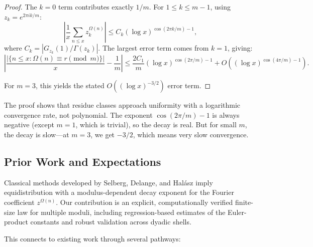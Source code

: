 \documentclass[12pt]{article}
\theoremstyle{definition}
\theoremstyle{remark}
\begin{document}
\begin{proof}
The $k = 0$ term contributes exactly $1/m$. For $1 \leq k \leq m-1$, using $z_k = e^{2\pi ik/m}$:
\[
\left|\frac{1}{x}\sum_{n \leq x} z_k^{\Omega(n)}\right| \leq C_k (\log x)^{\cos(2\pi k/m) - 1},
\]
where $C_k = |G_{z_k}(1)/\Gamma(z_k)|$. The largest error term comes from $k = 1$, giving:
\[
\left|\frac{|\{n \leq x : \Omega(n) \equiv r \pmod{m}\}|}{x} - \frac{1}{m}\right| \leq \frac{2C_1}{m}(\log x)^{\cos(2\pi/m) - 1} + O\left((\log x)^{\cos(4\pi/m) - 1}\right).
\]

For $m = 3$, this yields the stated $O((\log x)^{-3/2})$ error term.
\end{proof}

The proof shows that residue classes approach uniformity with a logarithmic convergence rate, not polynomial. The exponent $\cos(2\pi/m) - 1$ is always negative (except $m = 1$, which is trivial), so the decay is real. But for small $m$, the decay is slow—at $m = 3$, we get $-3/2$, which means very slow convergence.

\subsection{Prior Work and Expectations}

Classical methods developed by Selberg, Delange, and Hal\'asz imply equidistribution with a modulus-dependent decay exponent for the Fourier coefficient $z^{\Omega(n)}$. Our contribution is an explicit, computationally verified finite-size law for multiple moduli, including regression-based estimates of the Euler-product constants and robust validation across dyadic shells.

This connects to existing work through several pathways:
\end{document}
